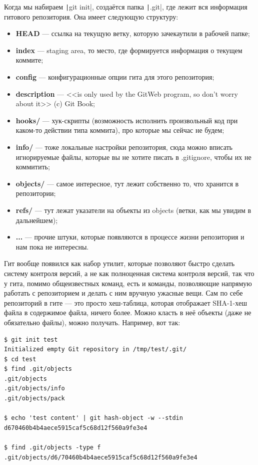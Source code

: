\documentclass[a5paper]{article}
\begin{document}
Когда мы набираем \texttt|git init|, создаётся папка \texttt|.git|, где лежит вся информация гитового репозитория. Она имеет следующую структуру:

\begin{itemize}
    \item \textbf{HEAD} --- ссылка на текущую ветку, которую зачекаутили в рабочей папке;
    \item \textbf{index} --- staging area, то место, где формируется информация о текущем коммите;
    \item \textbf{config} --- конфигурационные опции гита для этого репозитория;
    \item \textbf{description} --- <<is only used by the GitWeb program, so don’t worry about it>> (c) Git Book;
    \item \textbf{hooks/} --- хук-скрипты (возможность исполнить произвольный код при каком-то действии типа коммита), про которые мы сейчас не будем;
    \item \textbf{info/} --- тоже локальные настройки репозитория, сюда можно вписать игнорируемые файлы, которые вы не хотите писать в .gitignore, чтобы их не коммитить;
    \item \textbf{objects/} --- самое интересное, тут лежит собственно то, что хранится в репозитории;
    \item \textbf{refs/} --- тут лежат указатели на объекты из objects (ветки, как мы увидим в дальнейшем);
    \item \textbf{...} --- прочие штуки, которые появляются в процессе жизни репозитория и нам пока не интересны.
\end{itemize}

Гит вообще появился как набор утилит, которые позволяют быстро сделать систему контроля версий, а не как полноценная система контроля версий, так что у гита, помимо общеизвестных команд, есть и команды, позволяющие напрямую работать с репозиторием и делать с ним вручную ужасные вещи. Сам по себе репозиторий в гите --- это просто хеш-таблица, которая отображает SHA-1-хеш файла в содержимое файла, ничего более. Можно класть в неё объекты (даже не обязательно файлы), можно получать. Например, вот так:

\begin{verbatim}
$ git init test
Initialized empty Git repository in /tmp/test/.git/
$ cd test
$ find .git/objects
.git/objects
.git/objects/info
.git/objects/pack

$ echo 'test content' | git hash-object -w --stdin
d670460b4b4aece5915caf5c68d12f560a9fe3e4

$ find .git/objects -type f
.git/objects/d6/70460b4b4aece5915caf5c68d12f560a9fe3e4
\end{verbatim}
\end{document}
